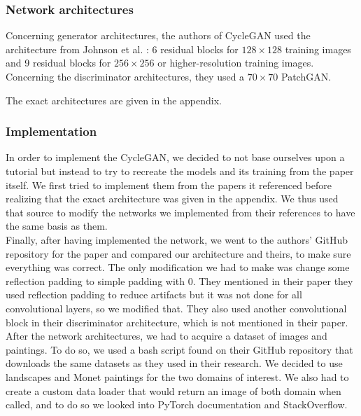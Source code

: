 \documentclass[twocolumn,superscriptaddress,aps,floatfix,nofootinbib]{revtex4-1}
\begin{document}
    \subsubsection{Network architectures}\label{sec:methods.cyclegan.architecture}
    
    Concerning generator architectures, the authors of CycleGAN used the architecture from Johnson et al. \cite{DBLP:journals/corr/JohnsonAL16} : 6 residual blocks for $128 \times 128$ training images and 9 residual blocks for $256 \times 256$ or higher-resolution training images.\\
    
    Concerning the discriminator architectures, they used a $70 \times 70$ PatchGAN.
    
    The exact architectures are given in the appendix.
    
    \subsubsection{Implementation}
    
    In order to implement the CycleGAN, we decided to not base ourselves upon a tutorial but instead to try to recreate the models and its training from the paper \cite{DBLP:journals/corr/ZhuPIE17} itself. We first tried to implement them from the papers it referenced before realizing that the exact architecture was given in the appendix. We thus used that source to modify the networks we implemented from their references to have the same basis as them.\\
    
    Finally, after having implemented the network, we went to the authors' GitHub repository\cite{cycgit} for the paper and compared our architecture and theirs, to make sure everything was correct. The only modification we had to make was change some reflection padding to simple padding with 0. They mentioned in their paper they used reflection padding to reduce artifacts but it was not done for all convolutional layers, so we modified that. They also used another convolutional block in their discriminator architecture, which is not mentioned in their paper.\\
    
    After the network architectures, we had to acquire a dataset of images and paintings. To do so, we used a bash script found on their GitHub repository that downloads the same datasets as they used in their research. We decided to use landscapes and Monet paintings for the two domains of interest. We also had to create a custom data loader that would return an image of both domain when called, and to do so we looked into PyTorch documentation and StackOverflow.\\
    
\end{document}
